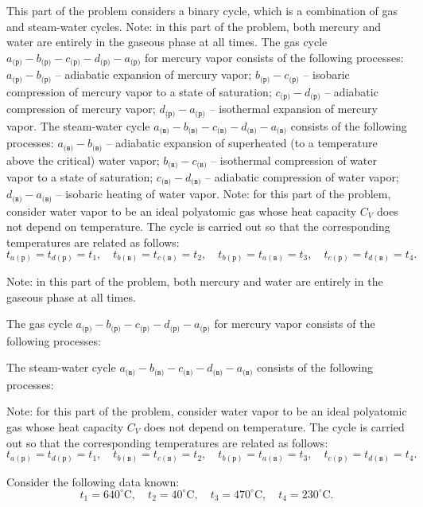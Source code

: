\documentclass[11pt,a4paper]{article}
\begin{document}
This part of the problem considers a binary cycle, which is a combination of gas and steam-water cycles. Note: in this part of the problem, both mercury and water are entirely in the gaseous phase at all times. The gas cycle $a_\text{(р)}-b_\text{(р)}-c_\text{(р)}-d_\text{(р)}-a_\text{(р)}$ for mercury vapor consists of the following processes: $a_\text{(р)}-b_\text{(р)}$ – adiabatic expansion of mercury vapor; $b_\text{(р)}-c_\text{(р)}$ – isobaric compression of mercury vapor to a state of saturation; $c_\text{(р)}-d_\text{(р)}$ – adiabatic compression of mercury vapor; $d_\text{(р)}-a_\text{(р)}$ – isothermal expansion of mercury vapor. The steam-water cycle $a_\text{(в)}-b_\text{(в)}-c_\text{(в)}-d_\text{(в)}-a_\text{(в)}$ consists of the following processes: $a_\text{(в)}-b_\text{(в)}$ – adiabatic expansion of superheated (to a temperature above the critical) water vapor; $b_\text{(в)}-c_\text{(в)}$ – isothermal compression of water vapor to a state of saturation; $c_\text{(в)}-d_\text{(в)}$ – adiabatic compression of water vapor; $d_\text{(в)}-a_\text{(в)}$ – isobaric heating of water vapor. Note: for this part of the problem, consider water vapor to be an ideal polyatomic gas whose heat capacity $C_V$ does not depend on temperature. The cycle is carried out so that the corresponding temperatures are related as follows: $$t_{a(\text{р})}=t_{d(\text{р})}=t_1,\quad t_{b(\text{в})}=t_{c(\text{в})}=t_2,\quad t_{b(\text{р})}=t_{a(\text{в})}=t_3,\quad t_{c(\text{р})}=t_{d(\text{в})}=t_4.$$

Note: in this part of the problem, both mercury and water are entirely in the gaseous phase at all times.

The gas cycle $a_\text{(р)}-b_\text{(р)}-c_\text{(р)}-d_\text{(р)}-a_\text{(р)}$ for mercury vapor consists of the following processes:

The steam-water cycle $a_\text{(в)}-b_\text{(в)}-c_\text{(в)}-d_\text{(в)}-a_\text{(в)}$ consists of the following processes:

Note: for this part of the problem, consider water vapor to be an ideal polyatomic gas whose heat capacity $C_V$ does not depend on temperature. The cycle is carried out so that the corresponding temperatures are related as follows: $$t_{a(\text{р})}=t_{d(\text{р})}=t_1,\quad t_{b(\text{в})}=t_{c(\text{в})}=t_2,\quad t_{b(\text{р})}=t_{a(\text{в})}=t_3,\quad t_{c(\text{р})}=t_{d(\text{в})}=t_4.$$

Consider the following data known:
$$t_1=640^\circ\mathrm{C},\quad t_2=40^\circ\mathrm{C},\quad t_3=470^\circ\mathrm{C},\quad t_4=230^\circ\mathrm{C}.$$
\end{document}

